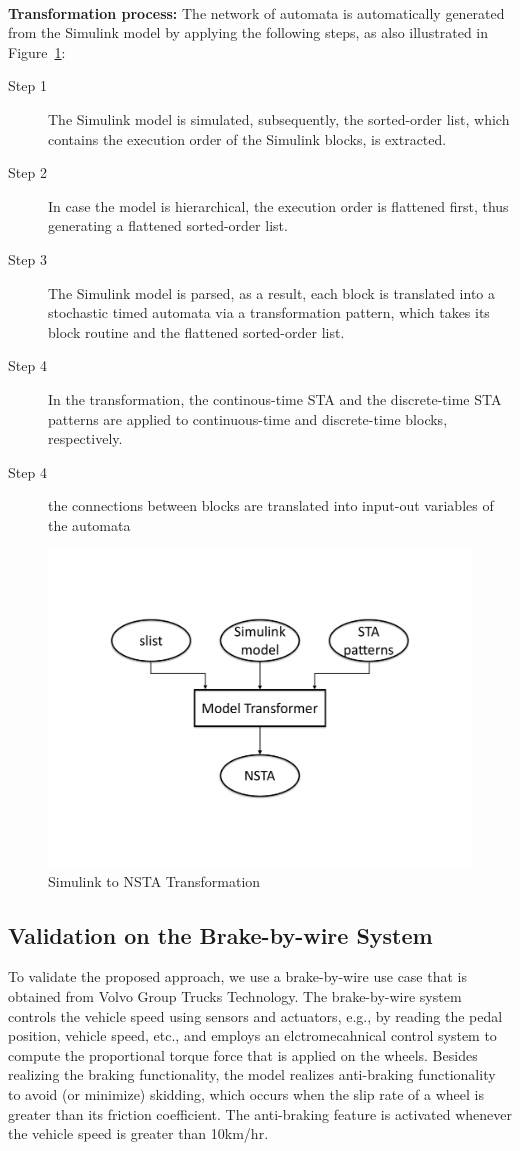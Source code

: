 \noindent\\ \textbf{Transformation process:} The network of automata is automatically generated from the Simulink model by applying the following steps, as also illustrated in Figure~\ref{fig_approachworkflow}:
\begin{description}
	\item[Step 1] The Simulink model is simulated, subsequently, the sorted-order list, which contains the execution order of the Simulink blocks, is extracted.
	\item[Step 2] In case the model is hierarchical, the execution order is flattened first, thus generating a flattened sorted-order list.
	\item[Step 3] The Simulink model is parsed, as a result, each block is translated into a stochastic timed automata via a transformation pattern, which takes its block routine and the flattened sorted-order list.
	\item[Step 4] In the transformation, the continous-time STA and the discrete-time STA patterns are applied to continuous-time and discrete-time blocks, respectively.
	\item[Step 4] the connections between blocks are translated into input-out variables of the automata 
\end{description}

\begin{figure}
	\centering
	\includegraphics[width=0.6\linewidth]{images/simulinkapproach}
	\caption{Simulink to NSTA Transformation}
	\label{fig_approachworkflow}
\end{figure}

\subsection{Validation on the Brake-by-wire System} 
To validate the proposed approach, we use a brake-by-wire use case that is obtained from Volvo Group Trucks Technology. The brake-by-wire system controls the vehicle speed using sensors and actuators, e.g., by reading the pedal position, vehicle speed, etc., and employs an elctromecahnical control system to compute the proportional torque force that is applied on the wheels. Besides realizing the braking functionality, the model realizes anti-braking functionality to avoid (or minimize) skidding, which occurs when the slip rate of a wheel is greater than its friction coefficient.  The anti-braking feature is activated whenever the vehicle speed is greater than 10km/hr.

